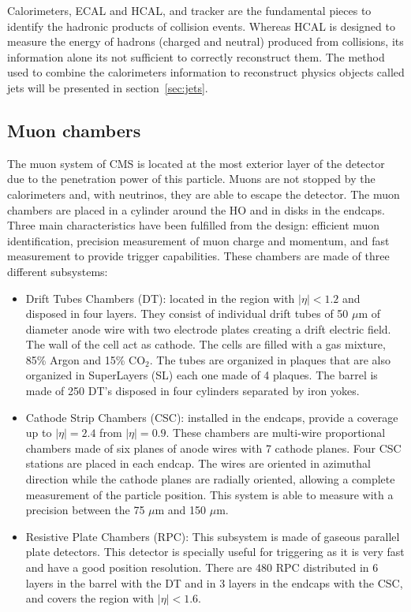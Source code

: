 Calorimeters, ECAL and HCAL, and tracker are the fundamental pieces to identify the hadronic products of collision events. Whereas HCAL is designed to measure the energy of hadrons (charged and neutral) produced from collisions, its information alone its not sufficient to correctly reconstruct them. The method used to combine the calorimeters information to reconstruct physics objects called jets will be presented in section~\ref{sec:jets}.

\subsection{Muon chambers}
\label{sec:muons}

The muon system of CMS is located at the most exterior layer of the detector  due to the penetration power of this particle. Muons are not stopped by the calorimeters and, with neutrinos, they are able to escape the detector. The muon chambers are placed in a cylinder around the HO and in disks in the endcaps. Three main characteristics have been fulfilled from the design: efficient muon identification, precision measurement of muon charge and momentum, and fast measurement to provide trigger capabilities. These chambers are made of three different subsystems:
\begin{itemize}
\item Drift Tubes Chambers (DT): located in the region with $|\eta|<1.2$ and disposed in four layers. They consist of individual drift tubes of 50 $\mu$m of diameter anode wire with two electrode plates creating a drift electric field. The wall of the cell act as cathode. The cells are filled with a gas mixture, 85\% Argon and 15\% $\text{CO}_{2}$. The tubes are organized in plaques that are also organized in SuperLayers (SL) each one made of 4 plaques. The barrel is made of 250 DT's disposed in four cylinders separated by iron yokes. 
\item Cathode Strip Chambers (CSC): installed in the endcaps, provide a coverage up to $|\eta|=2.4$ from $|\eta|=0.9$. These chambers are multi-wire proportional chambers made of six planes of anode wires with 7 cathode planes. Four CSC stations are placed in each endcap. The wires are oriented in azimuthal direction while the cathode planes are radially oriented, allowing a complete measurement of the particle position. This system is able to measure with a precision between the 75 $\mu$m and 150 $\mu$m.
\item Resistive Plate Chambers (RPC): This subsystem is made of gaseous parallel plate detectors. This detector is specially useful for triggering as it is very fast and have a good position resolution. There are 480 RPC distributed in 6 layers in the barrel with the DT and in 3 layers in the endcaps with the CSC, and covers the region with $|\eta|<1.6$. 
\end{itemize}

